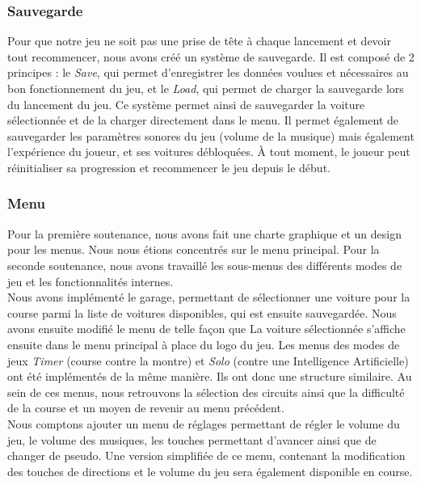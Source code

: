\documentclass[a4paper,12pt]{article}
\newcommand{\AI}{Intelligence Artificielle}
\begin{document}
            \subsubsection{Sauvegarde}
                Pour que notre jeu ne soit pas une prise de tête à chaque lancement et devoir tout recommencer, nous 
                avons créé un système de sauvegarde. Il est composé de 2 principes : le \textsl{Save}, qui permet 
                d'enregistrer les données voulues et nécessaires au bon fonctionnement du jeu, et le 
                \textsl{Load}, qui permet de charger la sauvegarde lors du lancement du jeu. Ce système permet
                ainsi de sauvegarder la voiture sélectionnée et de la charger directement dans le menu.
                Il permet également de sauvegarder les paramètres sonores du jeu (volume de la musique) mais également 
                l'expérience du joueur, et ses voitures débloquées. À tout moment, le joueur peut réinitialiser sa 
                progression et recommencer le 
                jeu depuis le début.

            \subsubsection{Menu}
                Pour la première soutenance, nous avons fait une charte graphique et un design pour les 
                menus.
                Nous nous étions concentrés sur le menu principal. Pour la seconde soutenance, nous 
                avons travaillé les sous-menus des différents modes de jeu et les fonctionnalités internes.\\
                Nous avons implémenté le garage, permettant de sélectionner une voiture pour la course parmi 
                la liste de voitures disponibles, qui est ensuite sauvegardée. 
                Nous avons ensuite modifié le menu de telle façon que La voiture sélectionnée s'affiche 
                ensuite dans le menu principal à place du logo du jeu. Les menus des modes de
                jeux \textsl{Timer} (course contre la montre) et \textsl{Solo} (contre une \AI) ont
                été implémentés de la même manière. Ils ont donc une structure similaire. Au sein de
                ces menus, nous retrouvons la sélection des circuits ainsi que la difficulté de la course et
                un moyen de revenir au menu précédent.\\
                Nous comptons ajouter un menu de réglages permettant de régler le volume du jeu, le volume
                des musiques, les touches permettant d'avancer ainsi que de changer de pseudo. Une 
                version simplifiée de ce menu, contenant la modification des touches de directions et le
                volume du jeu sera également disponible en course.
\end{document}
